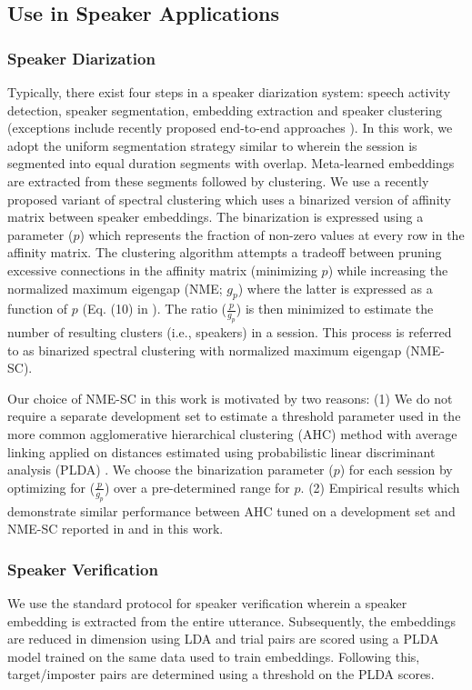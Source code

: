\subsection{Use in Speaker Applications}

\subsubsection{Speaker Diarization}
\label{subsubsec:bSCNME}
Typically, there exist four steps in a speaker diarization system: speech activity detection, speaker segmentation, embedding extraction and speaker clustering (exceptions include recently proposed end-to-end approaches \cite{horiguchi2020endtoend,fujita2020endtoend}). In this work, we adopt the uniform segmentation strategy similar to \cite{Sell2018_dihard, garciaRomero2017} wherein the session is segmented into equal duration segments with overlap. Meta-learned embeddings are extracted from these segments followed by clustering. We use a recently proposed variant of spectral clustering \cite{park_SC2020} which uses a binarized version of affinity matrix between speaker embeddings. The binarization is expressed using a parameter ($p$) which represents the fraction of non-zero values at every row in the affinity matrix.
The clustering algorithm attempts a tradeoff between pruning excessive connections in the affinity matrix (minimizing $p$) while increasing the normalized maximum eigengap (NME; $g_p$) where the latter is expressed as a function of $p$ (Eq. (10) in \cite{park_SC2020}). The ratio ($\frac{p}{g_p}$) is then minimized to estimate the number of resulting clusters (i.e., speakers) in a session. This process is referred to as binarized spectral clustering with normalized maximum eigengap (NME-SC).

Our choice of NME-SC in this work is motivated by two reasons: (1) We do not require a separate development set to estimate a threshold parameter used in the more common agglomerative hierarchical clustering (AHC) method with average linking applied on distances estimated using probabilistic linear discriminant analysis (PLDA) \cite{Sell2018_dihard}. We choose the binarization parameter ($p$) for each session by optimizing for ($\frac{p}{g_p}$) over a pre-determined range for $p$. (2) Empirical results which demonstrate similar performance between AHC tuned on a development set and NME-SC reported in \cite{park_SC2020} and in this work. 

\subsubsection{Speaker Verification}
We use the standard protocol for speaker verification wherein a speaker embedding is extracted from the entire utterance. Subsequently, the embeddings are reduced in dimension using LDA and trial pairs are scored using a PLDA model trained on the same data used to train embeddings. Following this, target/imposter pairs are determined using a threshold on the PLDA scores.

